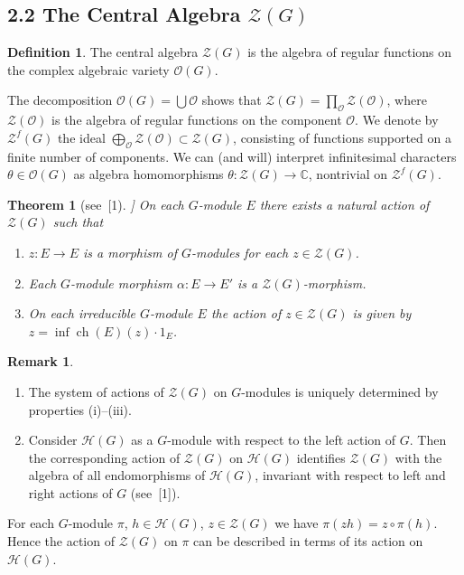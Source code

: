 \documentclass[12pt,a4paper]{article}
\theoremstyle{plain}
\newtheorem{theorem}{Theorem}
\theoremstyle{definition}
\newtheorem{definition}{Definition}
\newtheorem{remark}{Remark}
\theoremstyle{remark}
\DeclareMathOperator{\ch}{ch}
\newcommand{\cH}{\mathscr{H}}
\newcommand{\cO}{\mathcal{O}}
\newcommand{\cZ}{\mathcal{Z}}
\newcommand{\bC}{\mathbb{C}}
\begin{document}
\subsection*{2.2 The Central Algebra $\cZ(G)$}

\begin{definition}
The central algebra $\cZ(G)$ is the algebra of regular functions on the complex algebraic variety $\cO(G)$.
\end{definition}

The decomposition $\cO(G) = \bigcup \cO$ shows that $\cZ(G) = \prod_{\cO} \cZ(\cO)$, where $\cZ(\cO)$ is the algebra of regular functions on the component $\cO$. We denote by $\cZ^f(G)$ the ideal $\bigoplus_{\cO} \cZ(\cO) \subset \cZ(G)$, consisting of functions supported on a finite number of components. We can (and will) interpret infinitesimal characters $\theta \in \cO(G)$ as algebra homomorphisms $\theta: \cZ(G) \to \bC$, nontrivial on $\cZ^f(G)$.

\begin{theorem}[see~[1]]
On each $G$-module $E$ there exists a natural action of $\cZ(G)$ such that
\begin{enumerate}[label=(\roman*)]
\item $z: E \to E$ is a morphism of $G$-modules for each $z \in \cZ(G)$.
\item Each $G$-module morphism $\alpha: E \to E'$ is a $\cZ(G)$-morphism.
\item On each irreducible $G$-module $E$ the action of $z \in \cZ(G)$ is given by $z = \inf\ch(E)(z) \cdot 1_E$.
\end{enumerate}
\end{theorem}

\begin{remark}
\begin{enumerate}[label=(\arabic*)]
\item The system of actions of $\cZ(G)$ on $G$-modules is uniquely determined by properties (i)--(iii).
\item Consider $\cH(G)$ as a $G$-module with respect to the left action of $G$. Then the corresponding action of $\cZ(G)$ on $\cH(G)$ identifies $\cZ(G)$ with the algebra of all endomorphisms of $\cH(G)$, invariant with respect to left and right actions of $G$ (see~[1]).
\end{enumerate}
\end{remark}

For each $G$-module $\pi$, $h \in \cH(G)$, $z \in \cZ(G)$ we have $\pi(zh) = z \circ \pi(h)$. Hence the action of $\cZ(G)$ on $\pi$ can be described in terms of its action on $\cH(G)$.
\end{document}
